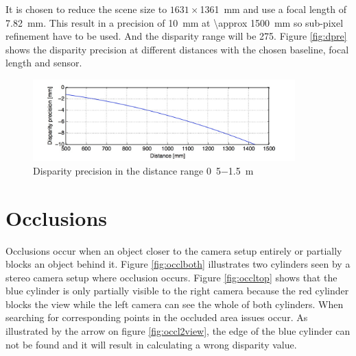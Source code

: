 It is chosen to reduce the scene size to $1631 \times$\SI{1361}{\milli\meter} and use a focal length of \SI{7.82}{\milli\meter}. This result in a precision of  \SI{10}{\milli\meter} at  \SI{\approx 1500}{\milli\meter} so sub-pixel refinement have to be used. And the disparity range will be 275. Figure \vref{fig:dpre} shows the disparity precision at different distances with the chosen baseline, focal length and sensor.
\begin{figure}[ht!]
  \centering
  \includegraphics[width=0.9\textwidth]{figures/dpre}
  \caption{Disparity precision in the distance range \si{0.5}\SI{-1.5}{\meter}}
  \label{fig:dpre}
\end{figure}

\section{Occlusions}
Occlusions occur when an object closer to the camera setup entirely or partially blocks an object behind it. Figure \vref{fig:occlboth} illustrates two cylinders seen by a stereo camera setup where occlusion occurs. Figure \vref{fig:occltop} shows that the blue cylinder is only partially visible to the right camera because the red cylinder blocks the view while the left camera can see the whole of both cylinders. When searching for corresponding points in the occluded area issues occur. As illustrated by the arrow on figure \vref{fig:occl2view}, the edge of the blue cylinder can not be found and it will result in calculating a wrong disparity value. \\

